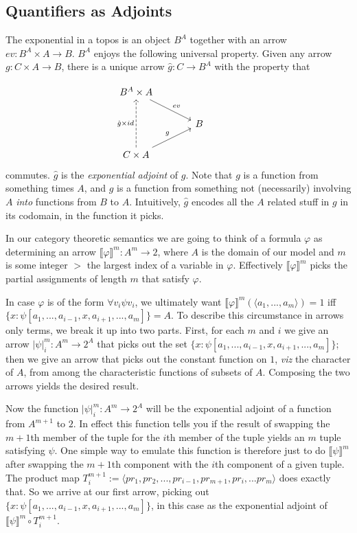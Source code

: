 \documentclass{asl}
\theoremstyle{definition}
\begin{document}
\subsection{Quantifiers as Adjoints}
The exponential in a topos is an object $B^A$ together with an arrow $ev : B^A \times A \to B$. $B^A$ enjoys the following universal property. Given any arrow $g : C \times A \to B$, there is a unique arrow $\hat g : C \to B^A$ with the property that

$$\begin{tikzcd}[column sep = large] 
B^A \times A \arrow[rd, "ev" ]  & \\
&B&\\
C \times A \arrow[uu, "{\hat g \times id}", dashed] \arrow[ru, "g"]
\end{tikzcd}$$
commutes. $\hat g$ is the \emph{exponential adjoint} of $g$. Note that $g$ is a function from something times $A$, and $\hat g$ is a function from something not (necessarily) involving $A$ \emph{into} functions from $B$ to $A$. Intuitively, $\hat g$ encodes all the $A$ related stuff in $g$ in its codomain, in the function it picks.

In our category theoretic semantics we are going to think of a formula $\varphi$ as determining an arrow $\llbracket \varphi \rrbracket^m : A^m \to 2$, where $A$ is the domain of our model and $m$ is some integer $>$ the largest index of a variable in $\varphi$. Effectively $\llbracket \varphi \rrbracket^m$ picks the partial assignments of length $m$ that satisfy $\varphi$.

In case $\varphi$ is of the form $\forall v_i \psi v_i$, we ultimately want $\llbracket \varphi \rrbracket^m(\langle a_1,...,a_m \rangle) = 1$ iff $\{x : \psi[ a_1,...,a_{i-1}, x, a_{i+1},...,a_m ] \} = A$. To describe this circumstance in arrows only terms, we break it up into two parts. First, for each $m$ and $i$ we give an arrow $|\psi|^m_i : A^m \to 2^A$ that picks out the set $\{x : \psi[ a_1,...,a_{i-1}, x, a_{i+1},...,a_m ] \}$; then we give an arrow that picks out the constant function on $1$, \emph{viz} the character of $A$, from among the characteristic functions of subsets of $A$. Composing the two arrows yields the desired result.

Now the function $|\psi|^m_i : A^m \to 2^A$ will be the exponential adjoint of a function from $A^{m+1}$ to $2$. In effect this function tells you if the result of swapping the $m+1$th member of the tuple for the $i$th member of the tuple yields an $m$ tuple satisfying $\psi$. One simple way to emulate this function is therefore just to do $\llbracket \psi \rrbracket^m$ after swapping the $m+1$th component with the $i$th component of a given tuple. The product map $T^{m+1}_i := \langle pr_1, pr_2,..., pr_{i-1}, pr_{m+1}, pr_i, ... pr_m \rangle$ does exactly that. So we arrive at our first arrow, picking out $\{x : \psi[ a_1,...,a_{i-1}, x, a_{i+1},...,a_m ] \} $, in this case as the exponential adjoint of $\llbracket \psi \rrbracket^m \circ T^{m+1}_i$. 
\end{document}
